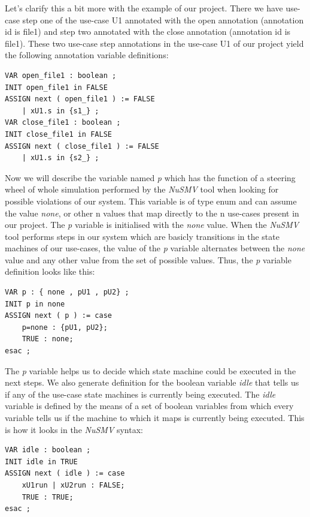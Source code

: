 Let's clarify this a bit more with the example of our project. There we have use-case step one of the use-case U1 annotated with the
open annotation (annotation id is file1) and step two annotated with the close annotation (annotation id is file1). These two use-case
step annotations in the use-case U1 of our project yield the following annotation variable definitions:

\begin{lstlisting}
VAR open_file1 : boolean ;
INIT open_file1 in FALSE
ASSIGN next ( open_file1 ) := FALSE
	| xU1.s in {s1_} ;
VAR close_file1 : boolean ;
INIT close_file1 in FALSE
ASSIGN next ( close_file1 ) := FALSE
	| xU1.s in {s2_} ;
\end{lstlisting}

Now we will describe the variable named \emph{p} which has the function of a steering wheel of whole simulation performed by the \emph{NuSMV} tool
when looking for possible violations of our system. This variable is of type enum and can assume the value \emph{none}, or other n values that
map directly to the n use-cases present in our project. The \emph{p} variable is initialised with the \emph{none} value. When the \emph{NuSMV} tool performs
steps in our system which are basicly transitions in the state machines of our use-cases, the value of the \emph{p} variable alternates between
the \emph{none} value and any other value from the set of possible values. Thus, the \emph{p} variable definition looks like this:
\begin{lstlisting}
VAR p : { none , pU1 , pU2} ;
INIT p in none
ASSIGN next ( p ) := case
	p=none : {pU1, pU2};
	TRUE : none;
esac ;
\end{lstlisting}

The \emph{p} variable helps us to decide which state machine could be executed in the next steps. We also generate definition for the
boolean variable \emph{idle} that tells us if any of the use-case state machines is currently being executed. The \emph{idle} variable is defined
by the means of a set of boolean variables from which every variable tells us if the machine to which it maps is currently
being executed. This is how it looks in the \emph{NuSMV} syntax:
\begin{lstlisting}
VAR idle : boolean ;
INIT idle in TRUE
ASSIGN next ( idle ) := case
	xU1run | xU2run : FALSE;
	TRUE : TRUE;
esac ;
\end{lstlisting}

